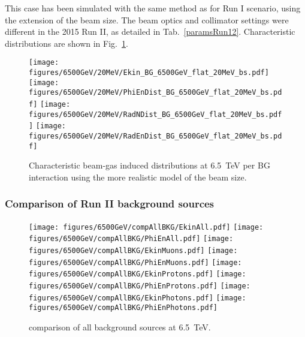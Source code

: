 This case has been simulated with the same method as for Run I scenario, using the extension of the beam size. The beam optics and collimator settings were different in the 2015 Run II, as detailed in Tab.~\ref{paramsRun12}. Characteristic distributions are shown in Fig.~\ref{bg6500}.

\begin{figure}[!htb]
\begin{center}
  \texttt{[image: figures/6500GeV/20MeV/Ekin\_BG\_6500GeV\_flat\_20MeV\_bs.pdf]}
  \texttt{[image: figures/6500GeV/20MeV/PhiEnDist\_BG\_6500GeV\_flat\_20MeV\_bs.pdf]}
  \texttt{[image: figures/6500GeV/20MeV/RadNDist\_BG\_6500GeV\_flat\_20MeV\_bs.pdf]}
  \texttt{[image: figures/6500GeV/20MeV/RadEnDist\_BG\_6500GeV\_flat\_20MeV\_bs.pdf]}
\end{center}
\vspace{-0.6cm}
 \caption{Characteristic beam-gas induced distributions at 6.5~TeV per BG interaction using the more realistic model of the beam size.
  \label{bg6500}}
\end{figure}


\subsubsection{Comparison of Run II background sources}
\begin{figure}
\begin{center}
  \texttt{[image: figures/6500GeV/compAllBKG/EkinAll.pdf]}
  \texttt{[image: figures/6500GeV/compAllBKG/PhiEnAll.pdf]}
  \texttt{[image: figures/6500GeV/compAllBKG/EkinMuons.pdf]}
  \texttt{[image: figures/6500GeV/compAllBKG/PhiEnMuons.pdf]}
  \texttt{[image: figures/6500GeV/compAllBKG/EkinProtons.pdf]}
  \texttt{[image: figures/6500GeV/compAllBKG/PhiEnProtons.pdf]}
  \texttt{[image: figures/6500GeV/compAllBKG/EkinPhotons.pdf]}
  \texttt{[image: figures/6500GeV/compAllBKG/PhiEnPhotons.pdf]}
\end{center}
\vspace{-0.6cm}
 \caption{comparison of all background sources at 6.5~TeV.
  \label{compAllBKG_6.5}}
\end{figure}

